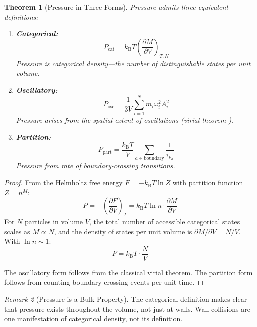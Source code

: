 \documentclass[twocolumn,10pt,a4paper]{article}
\theoremstyle{plain}
\newtheorem{theorem}{Theorem}[section]
\theoremstyle{definition}
\theoremstyle{remark}
\newtheorem{remark}[theorem]{Remark}
\newcommand{\kB}{k_{\mathrm{B}}}
\newcommand{\taup}{\tau_p}
\begin{document}
\begin{theorem}[Pressure in Three Forms]
\label{thm:pressure}
Pressure admits three equivalent definitions:
\begin{enumerate}
    \item \textbf{Categorical:}
    \begin{equation}
        P_{\mathrm{cat}} = \kB T \left(\frac{\partial M}{\partial V}\right)_{T,N}
    \end{equation}
    Pressure is categorical density---the number of distinguishable states per unit volume.

    \item \textbf{Oscillatory:}
    \begin{equation}
        P_{\mathrm{osc}} = \frac{1}{3V}\sum_{i=1}^{N} m_i \omega_i^2 A_i^2
    \end{equation}
    Pressure arises from the spatial extent of oscillations (virial theorem \cite{clausius1870}).

    \item \textbf{Partition:}
    \begin{equation}
        P_{\mathrm{part}} = \frac{\kB T}{V}\sum_{a \in \mathrm{boundary}} \frac{1}{\taup_a}
    \end{equation}
    Pressure from rate of boundary-crossing transitions.
\end{enumerate}
\end{theorem}

\begin{proof}
From the Helmholtz free energy $F = -\kB T \ln Z$ with partition function $Z = n^M$:
\begin{equation}
    P = -\left(\frac{\partial F}{\partial V}\right)_T = \kB T \ln n \cdot \frac{\partial M}{\partial V}
\end{equation}
For $N$ particles in volume $V$, the total number of accessible categorical states scales as $M \propto N$, and the density of states per unit volume is $\partial M/\partial V = N/V$. With $\ln n \sim 1$:
\begin{equation}
    P = \kB T \cdot \frac{N}{V}
\end{equation}

The oscillatory form follows from the classical virial theorem. The partition form follows from counting boundary-crossing events per unit time.
\end{proof}

\begin{remark}[Pressure is a Bulk Property]
The categorical definition makes clear that pressure exists throughout the volume, not just at walls. Wall collisions are one manifestation of categorical density, not its definition.
\end{remark}
\end{document}
